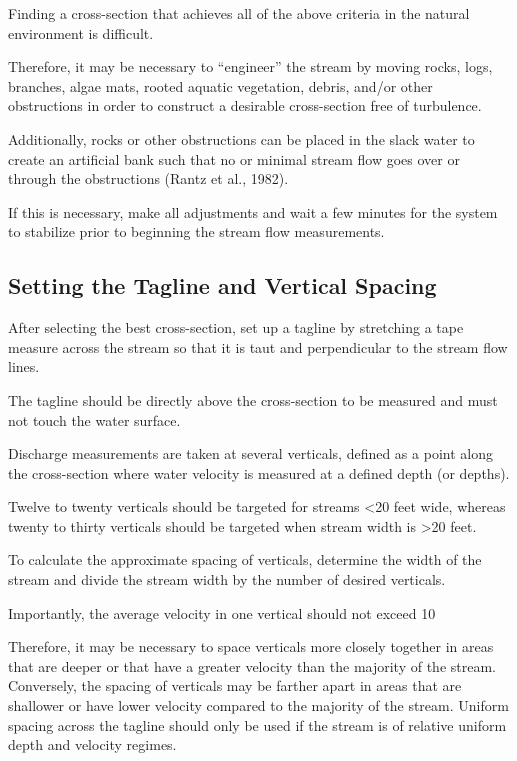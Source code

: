 \documentclass[12pt]{../SOP3_beta}\usepackage[]{graphicx}\usepackage[]{xcolor}
\begin{document}
\NP Finding a cross-section that achieves all of the above criteria in the natural environment
is difficult. 

\NP Therefore, it may be necessary to “engineer” the stream by moving rocks,
logs, branches, algae mats, rooted aquatic vegetation, debris, and/or other obstructions
in order to construct a desirable cross-section free of turbulence. 

\NP Additionally, rocks or
other obstructions can be placed in the slack water to create an artificial bank such that
no or minimal stream flow goes over or through the obstructions (Rantz et al., 1982). 

\NP If 
this is necessary, make all adjustments and wait a few minutes for the system to
stabilize prior to beginning the stream flow measurements.

\subsection{Setting the Tagline and Vertical Spacing}

\NP After selecting the best cross-section, set up a tagline by stretching a tape measure
across the stream so that it is taut and perpendicular to the stream flow lines. 

\NP The
tagline should be directly above the cross-section to be measured and must not touch
the water surface.

\NP Discharge measurements are taken at several verticals, defined as a point along the
cross-section where water velocity is measured at a defined depth (or depths). 

\NP Twelve
to twenty verticals should be targeted for streams <20 feet wide, whereas twenty to
thirty verticals should be targeted when stream width is >20 feet. 

\NP To calculate the
approximate spacing of verticals, determine the width of the stream and divide the
stream width by the number of desired verticals. 

\NP Importantly, the average velocity in
one vertical should not exceed 10%

\NP Therefore, it may be necessary to space verticals more closely together in areas that are
deeper or that have a greater velocity than the majority of the stream. Conversely, the 
spacing of verticals may be farther apart in areas that are shallower or have lower
velocity compared to the majority of the stream. Uniform spacing across the tagline
should only be used if the stream is of relative uniform depth and velocity regimes.
\end{document}
